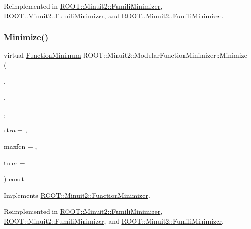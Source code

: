 Reimplemented in \mbox{\hyperlink{classROOT_1_1Minuit2_1_1FumiliMinimizer_a2bb7832765e33c24ffad4636ad3b7193}{R\+O\+O\+T\+::\+Minuit2\+::\+Fumili\+Minimizer}}, \mbox{\hyperlink{classROOT_1_1Minuit2_1_1FumiliMinimizer_a2bb7832765e33c24ffad4636ad3b7193}{R\+O\+O\+T\+::\+Minuit2\+::\+Fumili\+Minimizer}}, and \mbox{\hyperlink{classROOT_1_1Minuit2_1_1FumiliMinimizer_a2bb7832765e33c24ffad4636ad3b7193}{R\+O\+O\+T\+::\+Minuit2\+::\+Fumili\+Minimizer}}.

\mbox{\label{classROOT_1_1Minuit2_1_1ModularFunctionMinimizer_a8354ed4403dda68040ea4d1b174835c1}} 
\subsubsection{\texorpdfstring{Minimize()}{Minimize()}\hspace{0.1cm}{\footnotesize\ttfamily [6/33]}}
{\footnotesize\ttfamily virtual \mbox{\hyperlink{classROOT_1_1Minuit2_1_1FunctionMinimum}{Function\+Minimum}} R\+O\+O\+T\+::\+Minuit2\+::\+Modular\+Function\+Minimizer\+::\+Minimize (\begin{DoxyParamCaption}\item[{const \mbox{\hyperlink{classROOT_1_1Minuit2_1_1FCNGradientBase}{F\+C\+N\+Gradient\+Base}} \&}]{,  }\item[{const std\+::vector$<$ double $>$ \&}]{,  }\item[{const std\+::vector$<$ double $>$ \&}]{,  }\item[{unsigned int}]{stra = {},  }\item[{unsigned int}]{maxfcn = {},  }\item[{double}]{toler = {} }\end{DoxyParamCaption}) const\hspace{0.3cm}{\ttfamily [virtual]}}



Implements \mbox{\hyperlink{classROOT_1_1Minuit2_1_1FunctionMinimizer_ac6063af1cb58f0fd75b16d3cebc49f54}{R\+O\+O\+T\+::\+Minuit2\+::\+Function\+Minimizer}}.



Reimplemented in \mbox{\hyperlink{classROOT_1_1Minuit2_1_1FumiliMinimizer_a2bb7832765e33c24ffad4636ad3b7193}{R\+O\+O\+T\+::\+Minuit2\+::\+Fumili\+Minimizer}}, \mbox{\hyperlink{classROOT_1_1Minuit2_1_1FumiliMinimizer_a2bb7832765e33c24ffad4636ad3b7193}{R\+O\+O\+T\+::\+Minuit2\+::\+Fumili\+Minimizer}}, and \mbox{\hyperlink{classROOT_1_1Minuit2_1_1FumiliMinimizer_a2bb7832765e33c24ffad4636ad3b7193}{R\+O\+O\+T\+::\+Minuit2\+::\+Fumili\+Minimizer}}.


